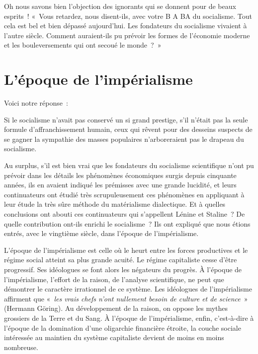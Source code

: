 \documentclass[french,twoside]{book} %
\begin{document}
\noindent Oh nous savons bien l’objection des ignorants qui se donnent pour de beaux esprits ! « Vous retardez, nous disent-ils, avec votre B A BA du socialisme. Tout cela est bel et bien dépassé aujourd’hui. Les fondateurs du socialisme vivaient à l’autre siècle. Comment auraient-ils pu prévoir les formes de l’économie moderne et les bouleversements qui ont secoué le monde ? »
\section[{L’époque de l’impérialisme}]{L’époque de l’impérialisme}
\noindent Voici notre réponse :\par
Si le socialisme n’avait pas conservé un si grand prestige, s’il n’était pas la seule formule d’affranchissement humain, ceux qui rêvent pour des desseins suspects de se gagner la sympathie des masses populaires n’arboreraient pas le drapeau du socialisme.\par
Au surplus, s’il est bien vrai que les fondateurs du socialisme scientifique n’ont pu prévoir dans les détails les phénomènes économiques surgis depuis cinquante années, ils en avaient indiqué les prémisses avec une grande lucidité, et leurs continuateurs ont étudié très scrupuleusement ces phénomènes en appliquant à leur étude la très sûre méthode du matérialisme dialectique. Et à quelles conclusions ont abouti ces continuateurs qui s’appellent Lénine et Staline ? De quelle contribution ont-ils enrichi le socialisme ? Ils ont expliqué que nous étions entrés, avec le vingtième siècle, dans l’époque de l’impérialisme.\par
L’époque de l’impérialisme est celle où le heurt entre les forces productives et le régime social atteint sa plus grande acuité. Le régime capitaliste cesse d’être progressif. Ses idéologues se font alors les négateurs du progrès. À l’époque de l’impérialisme, l’effort de la raison, de l’analyse scientifique, ne peut que démontrer le caractère irrationnel de ce système. Les idéologues de l’impérialisme affirment que « \emph{les vrais chefs n’ont nullement besoin de culture et de science} » (Hermann Göring). Au développement de la raison, on oppose les mythes grossiers de la Terre et du Sang. À l’époque de l’impérialisme, enfin, c’est-à-dire à l’époque de la domination d’une oligarchie financière étroite, la couche sociale intéressée au maintien du système capitaliste devient de moins en moins nombreuse.
\end{document}
